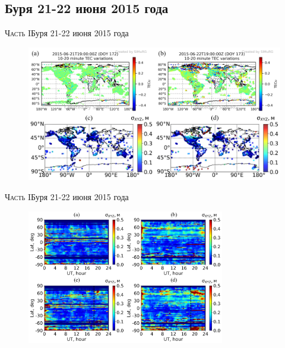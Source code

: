 \subsection{Буря 21-22 июня 2015 года}
\begin{frame}{\textsc{Часть I}}{Буря 21-22 июня 2015 года}
\begin{figure}
\includegraphics[width=\textwidth]{../fig/2015-172-173-19-00.png}   
\end{figure} 
\end{frame}

\begin{frame}{\textsc{Часть I}}{Буря 21-22 июня 2015 года}
\begin{figure}
\includegraphics[width=0.77\textwidth]{../fig/2015-172-173.png}   
\end{figure} 
\end{frame}

